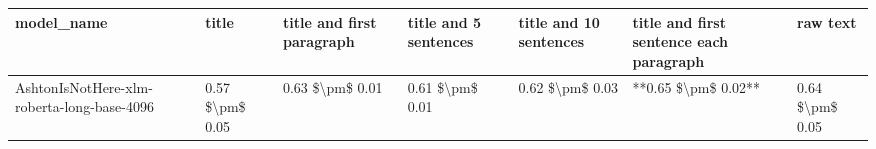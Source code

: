 \begin{tabular}{lllllll}
\toprule
                                model\_name &           title & title and first paragraph & title and 5 sentences & title and 10 sentences & title and first sentence each paragraph &        raw text \\
\midrule
AshtonIsNotHere-xlm-roberta-long-base-4096 & 0.57 \$\textbackslash pm\$ 0.05 &           0.63 \$\textbackslash pm\$ 0.01 &       0.61 \$\textbackslash pm\$ 0.01 &        0.62 \$\textbackslash pm\$ 0.03 &                     **0.65 \$\textbackslash pm\$ 0.02** & 0.64 \$\textbackslash pm\$ 0.05 \\
\bottomrule
\end{tabular}

